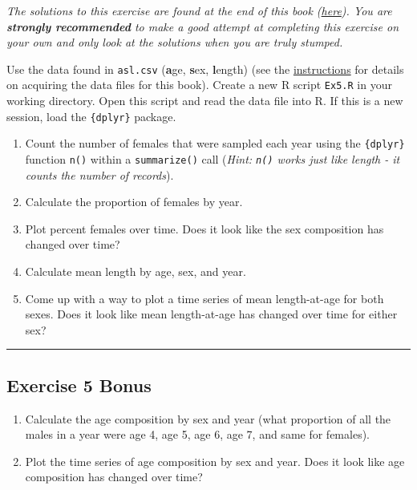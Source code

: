 \documentclass[]{book}
\providecommand{\tightlist}{%
  \setlength{\itemsep}{0pt}\setlength{\parskip}{0pt}}
\begin{document}
\emph{The solutions to this exercise are found at the end of this book (\protect\hyperlink{ex5-answers}{here}). You are \textbf{strongly recommended} to make a good attempt at completing this exercise on your own and only look at the solutions when you are truly stumped.}

Use the data found in \texttt{asl.csv} (\textbf{a}ge, \textbf{s}ex, \textbf{l}ength) (see the \protect\hyperlink{data-sets}{instructions} for details on acquiring the data files for this book). Create a new R script \texttt{Ex5.R} in your working directory. Open this script and read the data file into R. If this is a new session, load the \texttt{\{dplyr\}} package.

\begin{enumerate}
\def\labelenumi{\arabic{enumi}.}
\tightlist
\item
  Count the number of females that were sampled each year using the \texttt{\{dplyr\}} function \texttt{n()} within a \texttt{summarize()} call (\emph{Hint: \texttt{n()} works just like length - it counts the number of records}).
\item
  Calculate the proportion of females by year.
\item
  Plot percent females over time. Does it look like the sex composition has changed over time?
\item
  Calculate mean length by age, sex, and year.
\item
  Come up with a way to plot a time series of mean length-at-age for both sexes. Does it look like mean length-at-age has changed over time for either sex?
\end{enumerate}

\begin{center}\rule{0.5\linewidth}{\linethickness}\end{center}

\hypertarget{exercise-5-bonus}{%
\subsection*{Exercise 5 Bonus}\label{exercise-5-bonus}}

\begin{enumerate}
\def\labelenumi{\arabic{enumi}.}
\tightlist
\item
  Calculate the age composition by sex and year (what proportion of all the males in a year were age 4, age 5, age 6, age 7, and same for females).
\item
  Plot the time series of age composition by sex and year. Does it look like age composition has changed over time?
\end{enumerate}
\end{document}
